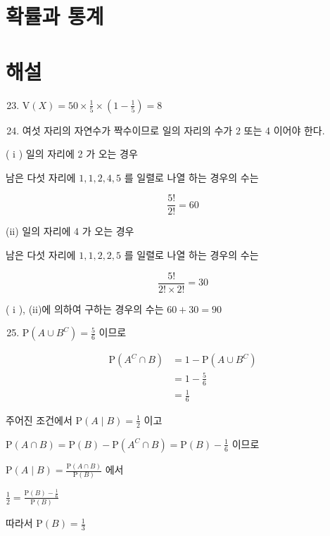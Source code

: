 \documentclass[10pt]{article}
\begin{document}
\section*{확률과 통계}
\section*{해설}
\begin{enumerate}
  \setcounter{enumi}{22}
  \item \(\mathrm{V}(X)=50 \times \frac{1}{5} \times\left(1-\frac{1}{5}\right)=8\)

  \item 여섯 자리의 자연수가 짝수이므로 일의 자리의 수가 2 또는 4 이어야 한다.

\end{enumerate}

( i ) 일의 자리에 2 가 오는 경우

남은 다섯 자리에 \(1,1,2,4,5\) 를 일렬로 나열 하는 경우의 수는

\[
\frac{5!}{2!}=60
\]

(ii) 일의 자리에 4 가 오는 경우

남은 다섯 자리에 \(1,1,2,2,5\) 를 일렬로 나열 하는 경우의 수는

\[
\frac{5!}{2!\times 2!}=30
\]

( i ), (ii)에 의하여 구하는 경우의 수는 \(60+30=90\)

\begin{enumerate}
  \setcounter{enumi}{24}
  \item \(\mathrm{P}\left(A \cup B^{C}\right)=\frac{5}{6}\) 이므로
\end{enumerate}

\[
\begin{aligned}
\mathrm{P}\left(A^{C} \cap B\right) & =1-\mathrm{P}\left(A \cup B^{C}\right) \\
& =1-\frac{5}{6} \\
& =\frac{1}{6}
\end{aligned}
\]

주어진 조건에서 \(\mathrm{P}(A \mid B)=\frac{1}{2}\) 이고

\(\mathrm{P}(A \cap B)=\mathrm{P}(B)-\mathrm{P}\left(A^{C} \cap B\right)=\mathrm{P}(B)-\frac{1}{6}\) 이므로

\(\mathrm{P}(A \mid B)=\frac{\mathrm{P}(A \cap B)}{\mathrm{P}(B)}\) 에서

\(\frac{1}{2}=\frac{\mathrm{P}(B)-\frac{1}{6}}{\mathrm{P}(B)}\)

따라서 \(\mathrm{P}(B)=\frac{1}{3}\)
\end{document}
